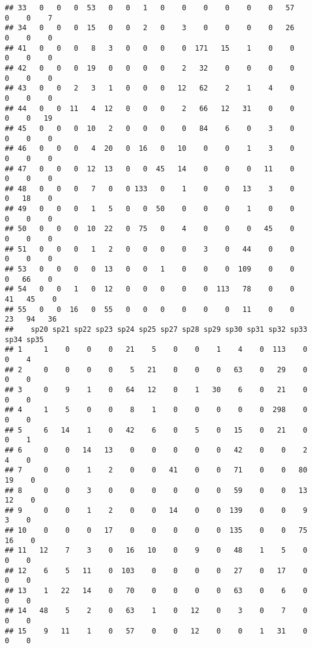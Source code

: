\documentclass[
]{book}
\begin{document}
\begin{verbatim}
## 33   0   0   0  53   0   0   1   0    0    0    0    0    0   57    0    0    7
## 34   0   0   0  15   0   0   2   0    3    0    0    0    0   26    0    0    0
## 41   0   0   0   8   3   0   0   0    0  171   15    1    0    0    0    0    0
## 42   0   0   0  19   0   0   0   0    2   32    0    0    0    0    0    0    0
## 43   0   0   2   3   1   0   0   0   12   62    2    1    4    0    0    0    0
## 44   0   0  11   4  12   0   0   0    2   66   12   31    0    0    0    0   19
## 45   0   0   0  10   2   0   0   0    0   84    6    0    3    0    0    0    0
## 46   0   0   0   4  20   0  16   0   10    0    0    1    3    0    0    0    0
## 47   0   0   0  12  13   0   0  45   14    0    0    0   11    0    0    0    0
## 48   0   0   0   7   0   0 133   0    1    0    0   13    3    0    0   18    0
## 49   0   0   0   1   5   0   0  50    0    0    0    1    0    0    0    0    0
## 50   0   0   0  10  22   0  75   0    4    0    0    0   45    0    0    0    0
## 51   0   0   0   1   2   0   0   0    0    3    0   44    0    0    0    0    0
## 53   0   0   0   0  13   0   0   1    0    0    0  109    0    0    0   66    0
## 54   0   0   1   0  12   0   0   0    0    0  113   78    0    0   41   45    0
## 55   0   0  16   0  55   0   0   0    0    0    0   11    0    0   23   94   36
##    sp20 sp21 sp22 sp23 sp24 sp25 sp27 sp28 sp29 sp30 sp31 sp32 sp33 sp34 sp35
## 1     1    0    0    0   21    5    0    0    1    4    0  113    0    0    4
## 2     0    0    0    0    5   21    0    0    0   63    0   29    0    0    0
## 3     0    9    1    0   64   12    0    1   30    6    0   21    0    0    0
## 4     1    5    0    0    8    1    0    0    0    0    0  298    0    0    0
## 5     6   14    1    0   42    6    0    5    0   15    0   21    0    0    1
## 6     0    0   14   13    0    0    0    0    0   42    0    0    2    4    0
## 7     0    0    1    2    0    0   41    0    0   71    0    0   80   19    0
## 8     0    0    3    0    0    0    0    0    0   59    0    0   13   12    0
## 9     0    0    1    2    0    0   14    0    0  139    0    0    9    3    0
## 10    0    0    0   17    0    0    0    0    0  135    0    0   75   16    0
## 11   12    7    3    0   16   10    0    9    0   48    1    5    0    0    0
## 12    6    5   11    0  103    0    0    0    0   27    0   17    0    0    0
## 13    1   22   14    0   70    0    0    0    0   63    0    6    0    0    0
## 14   48    5    2    0   63    1    0   12    0    3    0    7    0    0    0
## 15    9   11    1    0   57    0    0   12    0    0    1   31    0    0    0

\end{verbatim}
\end{document}
